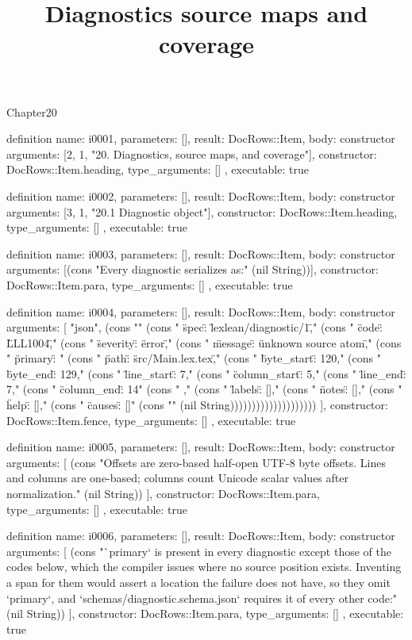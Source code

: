 \begin{lexlean}{Chapter20}
\title{Diagnostics source maps and coverage}
\begin{semanticmodule}
definition{
  name: i0001,
  parameters: [],
  result: DocRows::Item,
  body: constructor{
    arguments: [2, 1, "20. Diagnostics, source maps, and coverage"],
    constructor: DocRows::Item.heading,
    type_arguments: []
  },
  executable: true
}

definition{
  name: i0002,
  parameters: [],
  result: DocRows::Item,
  body: constructor{
    arguments: [3, 1, "20.1 Diagnostic object"],
    constructor: DocRows::Item.heading,
    type_arguments: []
  },
  executable: true
}

definition{
  name: i0003,
  parameters: [],
  result: DocRows::Item,
  body: constructor{
    arguments: [(cons "Every diagnostic serializes as:" (nil String))],
    constructor: DocRows::Item.para,
    type_arguments: []
  },
  executable: true
}

definition{
  name: i0004,
  parameters: [],
  result: DocRows::Item,
  body: constructor{
    arguments: [
      "json",
      (cons "{" (cons "  \"spec\": \"lexlean/diagnostic/1\"," (cons "  \"code\": \"LLL1004\"," (cons "  \"severity\": \"error\"," (cons "  \"message\": \"unknown source atom\"," (cons "  \"primary\": {" (cons "    \"path\": \"src/Main.lex.tex\"," (cons "    \"byte_start\": 120," (cons "    \"byte_end\": 129," (cons "    \"line_start\": 7," (cons "    \"column_start\": 5," (cons "    \"line_end\": 7," (cons "    \"column_end\": 14" (cons "  }," (cons "  \"labels\": []," (cons "  \"notes\": []," (cons "  \"help\": []," (cons "  \"causes\": []" (cons "}" (nil String))))))))))))))))))))
    ],
    constructor: DocRows::Item.fence,
    type_arguments: []
  },
  executable: true
}

definition{
  name: i0005,
  parameters: [],
  result: DocRows::Item,
  body: constructor{
    arguments: [
      (cons "Offsets are zero-based half-open UTF-8 byte offsets. Lines and columns are one-based; columns count Unicode scalar values after normalization." (nil String))
    ],
    constructor: DocRows::Item.para,
    type_arguments: []
  },
  executable: true
}

definition{
  name: i0006,
  parameters: [],
  result: DocRows::Item,
  body: constructor{
    arguments: [
      (cons "`primary` is present in every diagnostic except those of the codes below, which the compiler issues where no source position exists. Inventing a span for them would assert a location the failure does not have, so they omit `primary`, and `schemas/diagnostic.schema.json` requires it of every other code:" (nil String))
    ],
    constructor: DocRows::Item.para,
    type_arguments: []
  },
  executable: true
}


\end{semanticmodule}
\end{lexlean}
